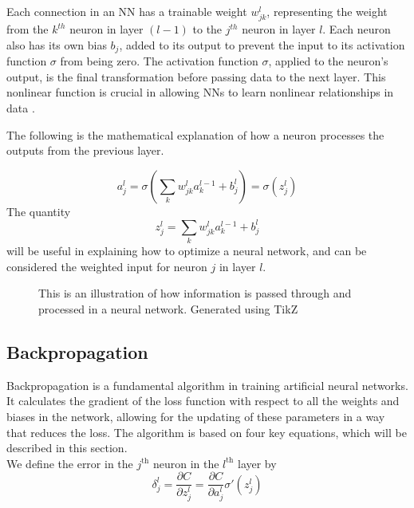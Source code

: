 Each connection in an NN has a trainable weight $w_{jk}^l$, representing the weight from the $k^{th}$ neuron in layer $(l-1)$ to the $j^{th}$ neuron in layer $l$.
Each neuron also has its own bias $b_j$, added to its output to prevent the input to its activation function $\sigma$ from being zero.
The activation function $\sigma$, applied to the neuron's output, is the final transformation before passing data to the next layer.
This nonlinear function is crucial in allowing NNs to learn nonlinear relationships in data \cite{universal_approximation}.

The following is the mathematical explanation of how a neuron processes the outputs from the previous layer.

\begin{equation} \label{eq:act_neuron}
    a_{j}^l = \sigma\left(\sum_k w_{jk}^l a^{l-1}_k+b_j^l \right) = \sigma(z_j^l)
\end{equation}
The quantity 
\begin{equation}\label{eq:z_neuron}
    z_j^l = \sum_{k} w_{jk}^l a^{l-1}_k+b_j^l
\end{equation}
 will be useful in explaining how to optimize a neural network, and can be considered the weighted input for neuron $j$ in layer $l$.


\begin{figure}[H]
    \centering
    
    \caption{This is an illustration of how information is passed through and processed in a neural network.
Generated using TikZ \cite{tikz}}
    \label{fig:nnfig}
\end{figure}




\subsection{Backpropagation}
Backpropagation\cite{backprop_original} is a fundamental algorithm in training artificial neural networks.
It calculates the gradient of the loss function with respect to all the weights and biases in the network,
allowing for the updating of these parameters in a way that reduces the loss.
The algorithm is based on four key equations, which will be described in this section.\\

We define the error in the $j^\text{th}$ neuron in the $l^\text{th}$ layer by
\begin{equation}\label{eq:bp1} 
    \delta_j^l = \frac{\partial C}{\partial z_j^l} = \frac{\partial C}{\partial a_j^l} \sigma '(z_j^l)
\end{equation}

